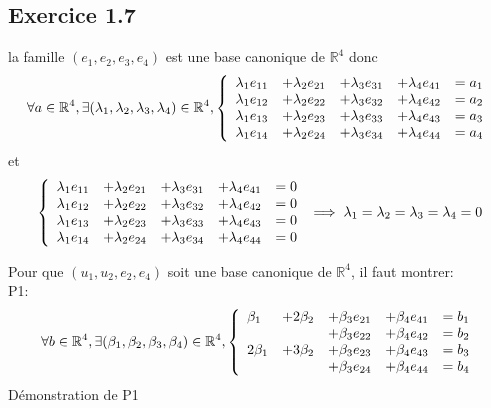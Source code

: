 \documentclass[]{book}
\theoremstyle{definition}
\newcommand{\bb}[1]{\mathbb{#1}}
\newcommand{\R}{\bb{R}}
\begin{document}
\subsection*{Exercice 1.7}
la famille $(e_1, e_2, e_3, e_4)$ est une base canonique de $\R^4$ donc
$$ \forall a \in \R^4, \exists (\lambda_1,\lambda_2,\lambda_3,\lambda_4) \in \R^4,
\left\{ 
\begin{array}{l l l l l}
  \lambda_1 e_{11} & +\lambda_2 e_{21} & +\lambda_3 e_{31} & +\lambda_4 e_{41} & = a_1 \\
  \lambda_1 e_{12} & +\lambda_2 e_{22} & +\lambda_3 e_{32} & +\lambda_4 e_{42} & = a_2 \\
  \lambda_1 e_{13} & +\lambda_2 e_{23} & +\lambda_3 e_{33} & +\lambda_4 e_{43} & = a_3 \\
  \lambda_1 e_{14} & +\lambda_2 e_{24} & +\lambda_3 e_{34} & +\lambda_4 e_{44} & = a_4 \\
\end{array}
\right. 
$$
et
$$
\left\{ 
\begin{array}{l l l l l}
  \lambda_1 e_{11} & +\lambda_2 e_{21} & +\lambda_3 e_{31} & +\lambda_4 e_{41} & = 0 \\
  \lambda_1 e_{12} & +\lambda_2 e_{22} & +\lambda_3 e_{32} & +\lambda_4 e_{42} & = 0 \\
  \lambda_1 e_{13} & +\lambda_2 e_{23} & +\lambda_3 e_{33} & +\lambda_4 e_{43} & = 0 \\
  \lambda_1 e_{14} & +\lambda_2 e_{24} & +\lambda_3 e_{34} & +\lambda_4 e_{44} & = 0 \\
\end{array}
\right. 
\implies
\lambda_1=\lambda_2=\lambda_3=\lambda_4=0
$$

Pour que $(u_1, u_2, e_2, e_4)$ soit une base canonique de $\R^4$, il faut montrer:\\
P1:
$$ \forall b \in \R^4, \exists (\beta_1,\beta_2,\beta_3,\beta_4) \in \R^4,
\left\{ 
\begin{array}{l l l l l}
  \beta_1  & +2\beta_2 & +\beta_3 e_{21} & +\beta_4 e_{41} & = b_1 \\
           &           & +\beta_3 e_{22} & +\beta_4 e_{42} & = b_2 \\
  2\beta_1 & +3\beta_2 & +\beta_3 e_{23} & +\beta_4 e_{43} & = b_3 \\
           &           & +\beta_3 e_{24} & +\beta_4 e_{44} & = b_4 \\
\end{array}
\right. 
$$
D\'emonstration de P1\\
\end{document}
